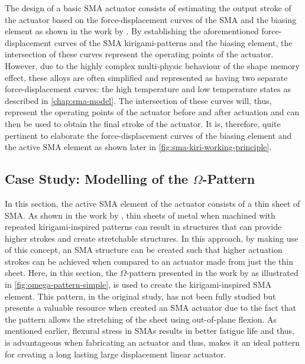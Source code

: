 The design of a basic SMA actuator consists of estimating the output stroke of the actuator based on the force-displacement curves of the SMA and the biasing element as shown in the work by \cite{dragoniDesignDevelopmentAdvanced2021}. By establishing the aforementioned force-displacement curves of the SMA kirigami-patterns and the biasing element, the intersection of these curves represent the operating points of the actuator. However, due to the highly complex multi-physic behaviour of the shape memory effect, these alloys are often simplified and represented as having two separate force-displacement curves: the high temperature and low temperature states as described in \cref{chap:sma-model}. The intersection of these curves will, thus, represent the operating points of the actuator before and after actuation and can then be used to obtain the final stroke of the actuator. It is, therefore, quite pertinent to elaborate the force-displacement curves of the biasing element and the active SMA element as shown later in \cref{fig:sma-kiri-working-principle}.

\subsection{Case Study: Modelling of the $\Omega$-Pattern}
In this section, the active SMA element of the actuator consists of a thin sheet of SMA. As shown in the work by \cite{morikawaUltrastretchableKirigamiBioprobes2018}, thin sheets of metal when machined with repeated kirigami-inspired patterns can result in structures that can provide higher strokes and create stretchable structures. In this approach, by making use of this concept, an SMA structure can be created such that higher actuation strokes can be achieved when compared to an actuator made from just the thin sheet. Here, in this section, the $\Omega$-pattern presented in the work by \cite{shyuKirigamiApproachEngineering2015} as illustrated in \cref{fig:omega-pattern-simple}, is used to create the kirigami-inspired SMA element. This pattern, in the original study, has not been fully studied but presents a valuable resource when created an SMA actuator due to the fact that the pattern allows the stretching of the sheet using out-of-plane flexion. As mentioned earlier, flexural stress in SMAs results in better fatigue life and thus, is advantageous when fabricating an actuator and thus, makes it an ideal pattern for creating a long lasting large displacement linear actuator.

